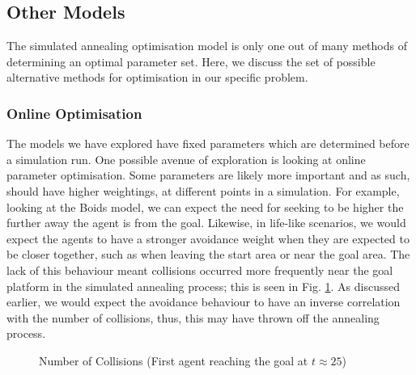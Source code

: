 \documentclass[12pt]{article}
\begin{document}
\subsection{Other Models}
The simulated annealing optimisation model is only one out of many methods of determining an optimal parameter set. Here, we discuss the set of possible alternative methods for optimisation in our specific problem.

\subsubsection{Online Optimisation}
The models we have explored have fixed parameters which are determined before a simulation run. One possible avenue of exploration is looking at online parameter optimisation. Some parameters are likely more important and as such, should have higher weightings, at different points in a simulation. For example, looking at the Boids model, we can expect the need for seeking to be higher the further away the agent is from the goal. Likewise, in life-like scenarios, we would expect the agents to have a stronger avoidance weight when they are expected to be closer together, such as when leaving the start area or near the goal area. The lack of this behaviour meant collisions occurred more frequently near the goal platform in the simulated annealing process; this is seen in Fig. \ref{fig:collisions-goal}. As discussed earlier, we would expect the avoidance behaviour to have an inverse correlation with the number of collisions, thus, this may have thrown off the annealing process.

\begin{figure}[ht]
    \centering
    \caption{Number of Collisions (First agent reaching the goal at $t\approx 25$)}
    \label{fig:collisions-goal}
\end{figure}
\end{document}
